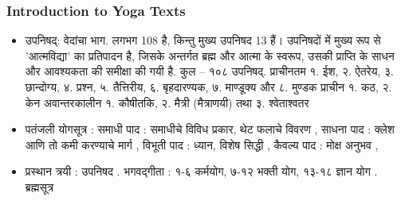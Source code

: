 \begin{frame}[fragile]\frametitle{Introduction to Yoga Texts}

\begin{itemize}
\item उपनिषद्: वेदांचा भाग. लगभग 108 है, किन्तु मुख्य उपनिषद 13 हैं। उपनिषदों में मुख्य रूप से 'आत्मविद्या' का प्रतिपादन है, जिसके अन्तर्गत ब्रह्म और आत्मा के स्वरूप, उसकी प्राप्ति के साधन और आवश्यकता की समीक्षा की गयी है. कुल -- १०८ उपनिषद्. प्राचीनतम  १. ईश, २. ऐतरेय, ३. छान्दोग्य, ४. प्रश्न, ५. तैत्तिरीय, ६. बृहदारण्यक, ७. माण्डूक्य और ८. मुण्डक
प्राचीन १. कठ, २. केन
अवान्तरकालीन १. कौषीतकि, २. मैत्री (मैत्राणयी) तथा ३. श्वेताश्वतर
\item पतंजली योगसूत्र :
समाधी पाद : समाधीचे विविध प्रकार, थेट फलाचे विवरण ,
साधना पाद : क्लेश आणि तो कमी करण्याचे मार्ग ,
विभूती पाद : ध्यान, विशेष सिद्धी ,
कैवल्य पाद : मोक्ष अनुभव ,

\item प्रस्थान त्रयी :
उपनिषद .
भगवद्गीता : १-६ कर्मयोग, ७-१२ भक्ती योग, १३-१८ ज्ञान योग .
ब्रह्मसूत्र 

\end{itemize}
	  
\end{frame}

